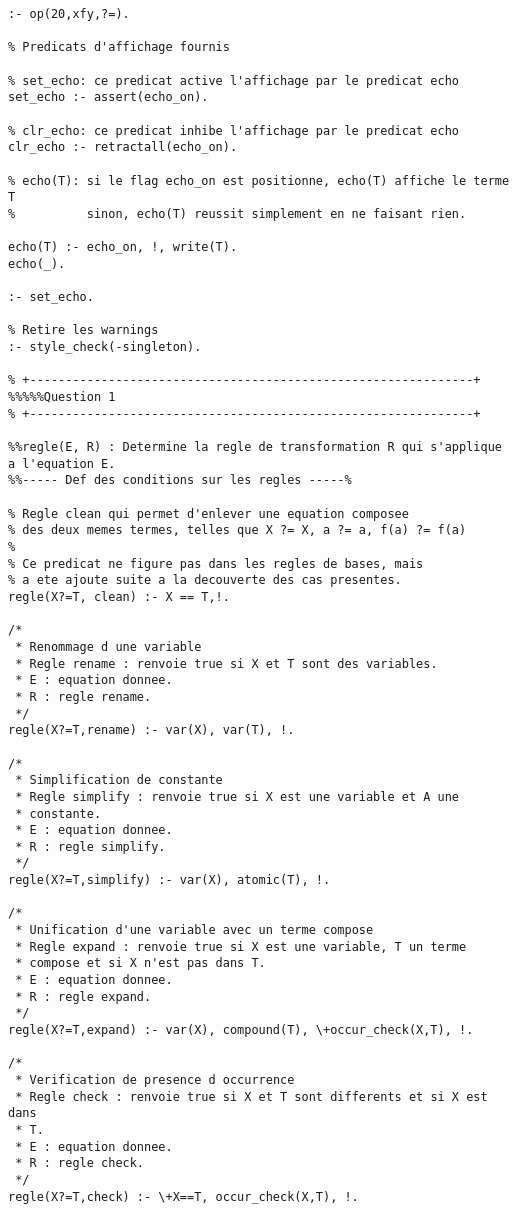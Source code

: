 \documentclass[10pt,a4paper]{report}
\begin{document}
\begin{lstlisting}[caption ={le fichier main.pl}]
% Definition de l'operateur "?=".
:- op(20,xfy,?=).

% Predicats d'affichage fournis

% set_echo: ce predicat active l'affichage par le predicat echo
set_echo :- assert(echo_on).

% clr_echo: ce predicat inhibe l'affichage par le predicat echo
clr_echo :- retractall(echo_on).

% echo(T): si le flag echo_on est positionne, echo(T) affiche le terme T
%          sinon, echo(T) reussit simplement en ne faisant rien.

echo(T) :- echo_on, !, write(T).
echo(_).

:- set_echo.

% Retire les warnings
:- style_check(-singleton).

% +--------------------------------------------------------------+
%%%%%Question 1
% +--------------------------------------------------------------+

%%regle(E, R) : Determine la regle de transformation R qui s'applique a l'equation E.
%%----- Def des conditions sur les regles -----%

% Regle clean qui permet d'enlever une equation composee 
% des deux memes termes, telles que X ?= X, a ?= a, f(a) ?= f(a)
%
% Ce predicat ne figure pas dans les regles de bases, mais
% a ete ajoute suite a la decouverte des cas presentes.
regle(X?=T, clean) :- X == T,!.

/*
 * Renommage d une variable
 * Regle rename : renvoie true si X et T sont des variables.
 * E : equation donnee.
 * R : regle rename.
 */
regle(X?=T,rename) :- var(X), var(T), !.
	 
/*
 * Simplification de constante
 * Regle simplify : renvoie true si X est une variable et A une
 * constante.
 * E : equation donnee.
 * R : regle simplify.
 */
regle(X?=T,simplify) :- var(X), atomic(T), !.

/*
 * Unification d'une variable avec un terme compose
 * Regle expand : renvoie true si X est une variable, T un terme
 * compose et si X n'est pas dans T.
 * E : equation donnee.
 * R : regle expand.
 */	
regle(X?=T,expand) :- var(X), compound(T), \+occur_check(X,T), !.

/*
 * Verification de presence d occurrence
 * Regle check : renvoie true si X et T sont differents et si X est dans
 * T.
 * E : equation donnee.
 * R : regle check.
 */	
regle(X?=T,check) :- \+X==T, occur_check(X,T), !.


\end{lstlisting}
\end{document}
